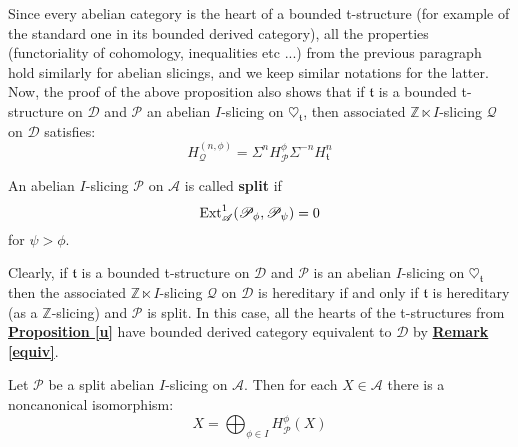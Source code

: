Since every abelian category is the heart of a bounded t-structure (for example of the standard one in its bounded derived category), all the properties (functoriality of cohomology, inequalities etc ...) from the previous paragraph hold similarly for abelian slicings, and we keep similar notations for the latter. Now, the proof of the above proposition also shows that if $\mathfrak{t}$ is a bounded t-structure on $\mathscr{D}$ and $\mathscr{P}$ an abelian $I$-slicing on $\heartsuit_{\mathfrak{t}}$, then associated $\mathbb{Z} \ltimes I$-slicing $\mathscr{Q}$ on $\mathscr{D}$ satisfies: $$H_{\mathscr{Q}}^{(n,\phi)}=\Sigma^n H_{\mathscr{P}}^{\phi} \Sigma^{-n} H_{\mathfrak{t}}^n$$  

%
%

\begin{defn}
An abelian $I$-slicing $\mathscr{P}$ on $\mathscr{A}$ is called \textbf{split} if $$\textnormal{Ext}_{\mathscr{A}}^1(\mathscr{P}_{\phi},\mathscr{P}_{\psi})=0$$ 
for $\psi > \phi$. 
\end{defn}

Clearly, if $\mathfrak{t}$ is a bounded t-structure on $\mathscr{D}$ and $\mathscr{P}$ is an abelian $I$-slicing on $\heartsuit_{\mathfrak{t}}$ then the associated $\mathbb{Z} \ltimes I$-slicing $\mathscr{Q}$ on $\mathscr{D}$ is hereditary if and only if $\mathfrak{t}$ is hereditary (as a $\mathbb{Z}$-slicing) and $\mathscr{P}$ is split. In this case, all the hearts of the t-structures from \hyperref[u]{\textbf{Proposition \ref*{u}}} have bounded derived category equivalent to $\mathscr{D}$ by \hyperref[equiv]{\textbf{Remark \ref*{equiv}}}. 

\begin{prop}\label{split}
Let $\mathscr{P}$ be a split abelian $I$-slicing on $\mathscr{A}$. Then for each $X \in \mathscr{A}$ there is a noncanonical isomorphism: $$X=\bigoplus_{\phi \in I}H_{\mathscr{P}}^{\phi}(X)$$
\end{prop}

